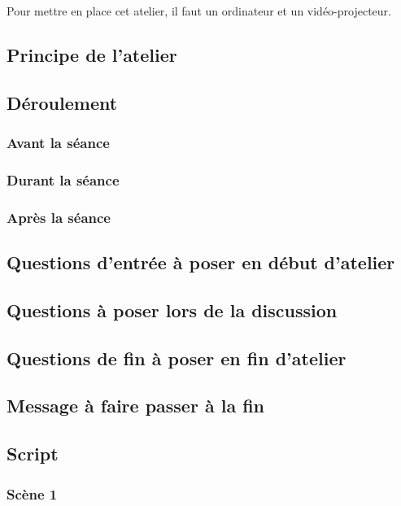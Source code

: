 \documentclass[a4paper]{article}
\begin{document}
Pour mettre en place cet atelier, il faut un ordinateur et un vidéo-projecteur.

\subsection{Principe de l'atelier}

\subsection{Déroulement}

\subsubsection{Avant la séance}

\subsubsection{Durant la séance}

\subsubsection{Après la séance}

\subsection{Questions d'entrée à poser en début d'atelier}

\subsection{Questions à poser lors de la discussion}

\subsection{Questions de fin à poser en fin d'atelier}

\subsection{Message à faire passer à la fin}

\subsection{Script}

    \subsubsection{Scène 1}
    
\end{document}
